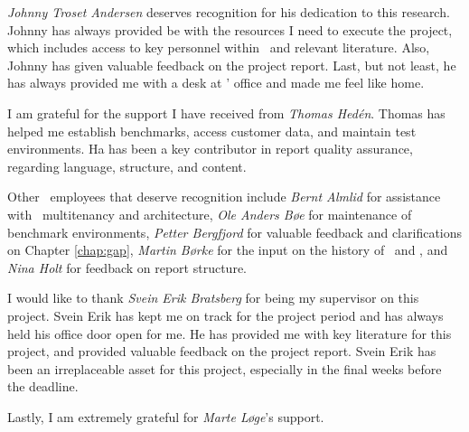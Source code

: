 \textit{Johnny Troset Andersen} deserves recognition for his dedication to this research. Johnny has always provided be with the resources I need to execute the project, which includes access to key personnel within \genus~and relevant literature. Also, Johnny has given valuable feedback on the project report. Last, but not least, he has always provided me with a desk at \genus' office and made me feel like home.

I am grateful for the support I have received from \textit{Thomas Hedén}. Thomas has helped me establish benchmarks, access customer data, and maintain test environments. Ha has been a key contributor in report quality assurance, regarding language, structure, and content.

Other \genus~employees that deserve recognition include \textit{Bernt Almlid} for assistance with \gap~multitenancy and architecture, \textit{Ole Anders Bøe} for maintenance of benchmark environments, \textit{Petter Bergfjord} for valuable feedback and clarifications on Chapter \ref{chap:gap}, \textit{Martin Børke} for the input on the history of \bi~and \mde, and \textit{Nina Holt} for feedback on report structure. 

I would like to thank \textit{Svein Erik Bratsberg} for being my supervisor on this project. Svein Erik has kept me on track for the project period and has always held his office door open for me. He has provided me with key literature for this project, and provided valuable feedback on the project report. Svein Erik has been an irreplaceable asset for this project, especially in the final weeks before the deadline.

Lastly, I am extremely grateful for \textit{Marte Løge}'s support.
